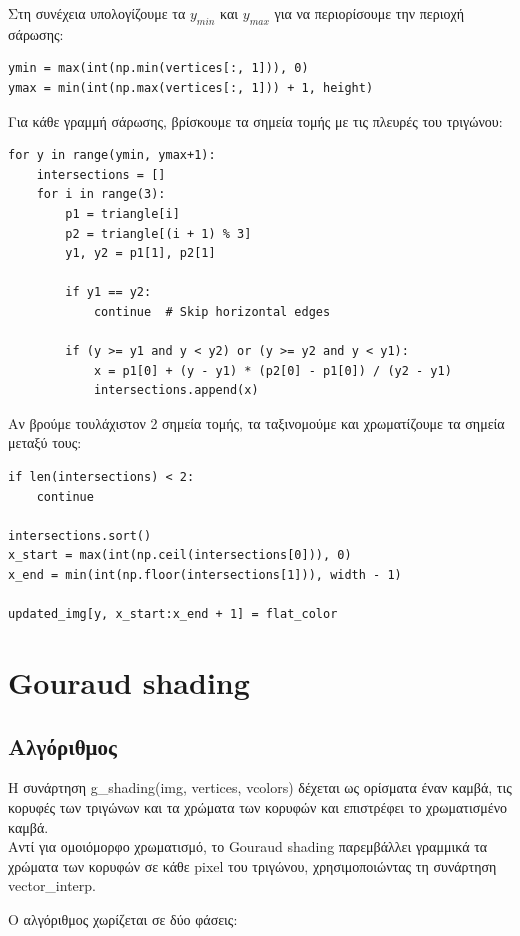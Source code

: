 \documentclass{article}
\begin{document}
Στη συνέχεια υπολογίζουμε τα $y_{min}$ και $y_{max}$ για να περιορίσουμε την περιοχή σάρωσης:

\begin{lstlisting}
ymin = max(int(np.min(vertices[:, 1])), 0)
ymax = min(int(np.max(vertices[:, 1])) + 1, height)
\end{lstlisting}

Για κάθε γραμμή σάρωσης, βρίσκουμε τα σημεία τομής με τις πλευρές του τριγώνου:

\begin{lstlisting}
for y in range(ymin, ymax+1):
    intersections = []
    for i in range(3):
        p1 = triangle[i]
        p2 = triangle[(i + 1) % 3]
        y1, y2 = p1[1], p2[1]

        if y1 == y2:
            continue  # Skip horizontal edges

        if (y >= y1 and y < y2) or (y >= y2 and y < y1):
            x = p1[0] + (y - y1) * (p2[0] - p1[0]) / (y2 - y1)
            intersections.append(x)
\end{lstlisting}

Αν βρούμε τουλάχιστον 2 σημεία τομής, τα ταξινομούμε και χρωματίζουμε τα σημεία μεταξύ τους:

\begin{lstlisting}
if len(intersections) < 2:
    continue

intersections.sort()
x_start = max(int(np.ceil(intersections[0])), 0)
x_end = min(int(np.floor(intersections[1])), width - 1)

updated_img[y, x_start:x_end + 1] = flat_color
\end{lstlisting}

\section{Gouraud shading}

\subsection{Αλγόριθμος}
Η συνάρτηση g\_shading(img, vertices, vcolors) δέχεται ως ορίσματα έναν καμβά, τις κορυφές των τριγώνων και τα χρώματα των κορυφών και επιστρέφει το χρωματισμένο καμβά.\\
Αντί για ομοιόμορφο χρωματισμό, το Gouraud shading παρεμβάλλει γραμμικά τα χρώματα των κορυφών σε κάθε pixel του τριγώνου, χρησιμοποιώντας τη συνάρτηση vector\_interp.

Ο αλγόριθμος χωρίζεται σε δύο φάσεις:
\end{document}
